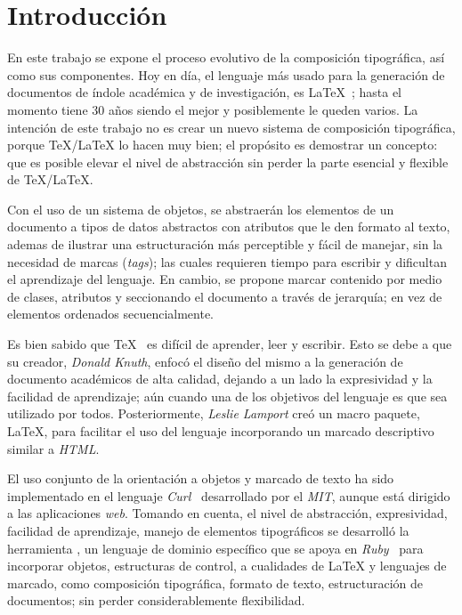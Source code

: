 \documentclass[12pt,letterpaper,titlepage,oneside,openright]{book}
\newcommand{\OhTeX}{%
    \makebox[0.76em][c]{O}%
    \makebox[0.25em][c]{%
        \raisebox{0.14em}[0em][0em]{%
            \fontsize{0.5em}{0cm}%
                \selectfont H%
        }%
    }%
    \makebox[1.35em][c]{\TeX}%
}
\newcommand{\latex}{\LaTeX\xspace}
\newcommand{\tex}{\TeX\xspace}
\newcommand{\ohtex}{\OhTeX\xspace}
\newcommand{\ruby}{\textit{Ruby}\xspace}
\begin{document}
\newpage

{\setlength{\parskip}{0.7em}
\tableofcontents
{}
}

\newpage

{\setlength{\parskip}{0.7em}
\lstlistoflistings
{}
}

\mainmatter


\chapter{Introducción}

En este trabajo se expone el proceso evolutivo de la composición tipográfica, así como sus componentes. Hoy en día, el lenguaje más usado para la generación de documentos de índole académica y de investigación, es \latex~\cite{weblatexhp}; hasta el momento tiene 30 años siendo el mejor y posiblemente le queden varios. La intención de este trabajo no es crear un nuevo sistema de composición tipográfica, porque \tex/\latex lo hacen muy bien; el propósito es demostrar un concepto: que es posible elevar el nivel de abstracción sin perder la parte esencial y flexible de \tex/\latex.

Con el uso de un sistema de objetos, se abstraerán los elementos de un documento a tipos de datos abstractos con atributos que le den formato al texto, ademas de ilustrar una estructuración más perceptible y fácil de manejar, sin la necesidad de marcas (\textit{tags}); las cuales requieren tiempo para escribir y dificultan el aprendizaje del lenguaje. En cambio, se propone marcar contenido por medio de clases, atributos y seccionando el documento a través de jerarquía; en vez de elementos ordenados secuencialmente.

Es bien sabido que \tex~\cite{webtexhp} es difícil de aprender, leer y escribir. Esto se debe a que su creador, \textit{Donald Knuth}, enfocó el diseño del mismo a la generación de documento académicos de alta calidad, dejando a un lado la expresividad y la facilidad de aprendizaje; aún cuando una de los objetivos del lenguaje es que sea utilizado por todos. Posteriormente, \textit{Leslie Lamport} creó un macro paquete, \latex, para facilitar el uso del lenguaje incorporando un marcado descriptivo similar a \textit{HTML}.

El uso conjunto de la orientación a objetos y marcado de texto ha sido implementado en el lenguaje \textit{Curl}~\cite{webcurlhp} desarrollado por el \textit{MIT}, aunque está dirigido a las aplicaciones \textit{web}. Tomando en cuenta, el nivel de abstracción, expresividad, facilidad de aprendizaje, manejo de elementos tipográficos se desarrolló la herramienta \ohtex, un lenguaje de dominio específico que se apoya en \ruby~\cite{webrubyhp} para incorporar objetos, estructuras de control, a cualidades de \latex y lenguajes de marcado, como composición tipográfica, formato de texto, estructuración de documentos; sin perder considerablemente flexibilidad.
\end{document}
